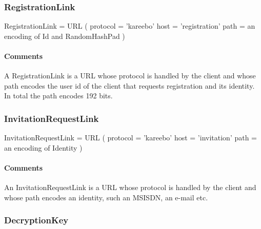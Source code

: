 \documentclass[a4paper,10pt]{article}
\begin{document}
\subsubsection{RegistrationLink}

\begin{verbbox}
RegistrationLink = URL
(
  protocol = 'kareebo'
  host = 'registration'
  path = an encoding of Id and RandomHashPad
)
\end{verbbox}
\begin{center}
\theverbbox
\end{center}

\begin{inparaitem}[ ]
 \item \infrastructure
\end{inparaitem}

\paragraph*{Comments}
A RegistrationLink is a URL whose protocol is handled by the client and whose path encodes the user id of the client that requests registration and its identity. In total the path 
encodes 192 bits.

\subsubsection{InvitationRequestLink}

\begin{verbbox}
InvitationRequestLink = URL
(
  protocol = 'kareebo'
  host = 'invitation'
  path = an encoding of Identity
)
\end{verbbox}
\begin{center}
\theverbbox
\end{center}

\begin{inparaitem}[ ]
 \item \infrastructure
\end{inparaitem}

\paragraph*{Comments}
An InvitationRequestLink is a URL whose protocol is handled by the client and whose path encodes an identity, such an MSISDN, an e-mail etc.

\subsubsection{DecryptionKey}
\end{document}
